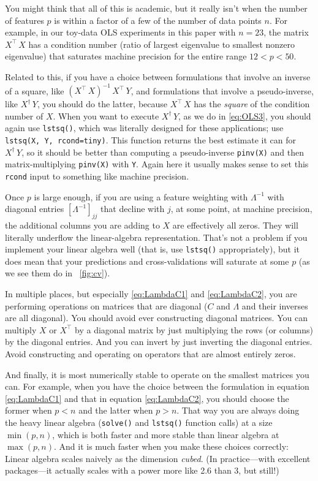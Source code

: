 \documentclass[12pt,letterpaper]{article}
\newcommand{\code}[1]{\texttt{#1}}
\begin{document}
You might think that all of this is academic, but it really isn't when the number of features $p$ is within a factor of a few of the number of data points $n$.
For example, in our toy-data OLS experiments in this paper with $n=23$, the matrix $X^\top\,X$ has a condition number (ratio of largest eigenvalue to smallest nonzero eigenvalue) that saturates machine precision for the entire range $12 < p < 50$.

Related to this, if you have a choice between formulations that involve an inverse of a square, like $(X^\top\,X)^{-1}\,X^\top\,Y$, and formulations that involve a pseudo-inverse, like $X^\dagger\,Y$, you should do the latter, because $X^\top\,X$ has the \emph{square} of the condition number of $X$.
When you want to execute $X^\dagger\,Y$, as we do in \eqref{eq:OLS3}, you should again use \code{lstsq()}, which was literally designed for these applications; use \code{lstsq(X, Y, rcond=tiny)}.
This function returns the best estimate it can for $X^\dagger\,Y$, so
it should be better than computing a pseudo-inverse \code{pinv(X)} and then matrix-multiplying \code{pinv(X)} with \code{Y}.
Again here it usually makes sense to set this \code{rcond} input to something like machine precision.

Once $p$ is large enough, if you are using a feature weighting with $\Lambda^{-1}$ with diagonal entries $[\Lambda^{-1}]_{jj}$ that decline with $j$, at some point, at machine precision, the additional columns you are adding to $X$ are effectively all zeros.
They will literally underflow the linear-algebra representation.
That's not a problem if you implement your linear algebra well (that is, use \code{lstsq()} appropriately), but it does mean that your predictions and cross-validations will saturate at some $p$ (as we see them do in \figurename~\ref{fig:cv}).

In multiple places, but especially \eqref{eq:LambdaC1} and \eqref{eq:LambdaC2}, you are performing operations on matrices that are diagonal ($C$ and $\Lambda$ and their inverses are all diagonal).
You should avoid ever constructing diagonal matrices.
You can multiply $X$ or $X^\top$ by a diagonal matrix by just multiplying the rows (or columns) by the diagonal entries.
And you can invert by just inverting the diagonal entries.
Avoid constructing and operating on operators that are almost entirely zeros.

And finally, it is most numerically stable to operate on the smallest matrices you can.
For example, when you have the choice between the formulation in equation \eqref{eq:LambdaC1} and that in equation \eqref{eq:LambdaC2}, you should choose the former when $p<n$ and the latter when $p>n$.
That way you are always doing the heavy linear algebra (\code{solve()} and \code{lstsq()} function calls) at a size $\min(p, n)$, which is both faster and more stable than linear algebra at $\max(p, n)$. And it is much faster when you make these choices correctly:
Linear algebra scales naively as the dimension \emph{cubed}.
(In practice---with excellent packages---it actually scales with a power more like 2.6 than 3, but still!)
\end{document}
